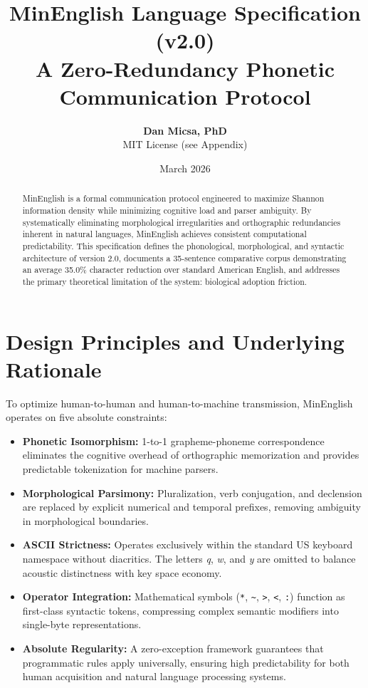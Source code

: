 \documentclass[10pt,twocolumn,letterpaper]{article}
\title{\Huge\textbf{MinEnglish Language Specification (v2.0)}\\[0.3em]
\LARGE A Zero-Redundancy Phonetic Communication Protocol}
\author{\textbf{Dan Micsa, PhD}\\
\small MIT License (see Appendix)}
\date{March 2026}
\newcommand{\me}[1]{\texttt{#1}}
\begin{document}
\maketitle

\begin{abstract}
MinEnglish is a formal communication protocol engineered to maximize Shannon information density while minimizing cognitive load and parser ambiguity. By systematically eliminating morphological irregularities and orthographic redundancies inherent in natural languages, MinEnglish achieves consistent computational predictability. This specification defines the phonological, morphological, and syntactic architecture of version 2.0, documents a 35-sentence comparative corpus demonstrating an average 35.0\% character reduction over standard American English, and addresses the primary theoretical limitation of the system: biological adoption friction.
\end{abstract}

\section{Design Principles and Underlying Rationale}

To optimize human-to-human and human-to-machine transmission, MinEnglish operates on five absolute constraints:

\begin{itemize}[leftmargin=*]
    \item \textbf{Phonetic Isomorphism:} 1-to-1 grapheme-phoneme correspondence eliminates the cognitive overhead of orthographic memorization and provides predictable tokenization for machine parsers.
    \item \textbf{Morphological Parsimony:} Pluralization, verb conjugation, and declension are replaced by explicit numerical and temporal prefixes, removing ambiguity in morphological boundaries.
    \item \textbf{ASCII Strictness:} Operates exclusively within the standard US keyboard namespace without diacritics. The letters \textit{q}, \textit{w}, and \textit{y} are omitted to balance acoustic distinctness with key space economy.
    \item \textbf{Operator Integration:} Mathematical symbols (\me{*}, \me{\~{}}, \me{>}, \me{<}, \me{:}) function as first-class syntactic tokens, compressing complex semantic modifiers into single-byte representations.
    \item \textbf{Absolute Regularity:} A zero-exception framework guarantees that programmatic rules apply universally, ensuring high predictability for both human acquisition and natural language processing systems.
\end{itemize}
\end{document}
